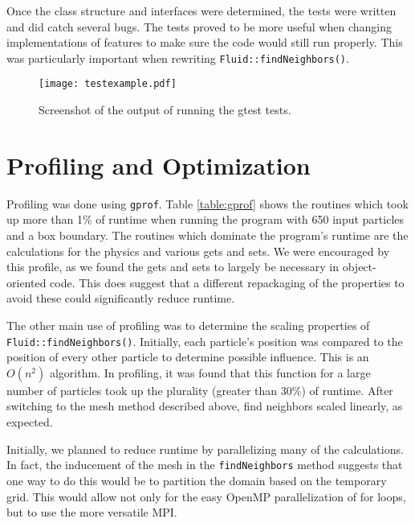 \documentclass[11pt]{article}
\begin{document}
Once the class structure and interfaces were determined, the tests were written
and did catch several bugs. The tests proved to be more useful when changing
implementations of features to make sure the code would still run properly. This
was particularly important when rewriting \texttt{Fluid::findNeighbors()}.

\begin{figure}
\begin{center}
\texttt{[image: testexample.pdf]}

\caption{Screenshot of the output of running the gtest tests.}
\label{fig:tests}
\end{center}
\end{figure}

\section{Profiling and Optimization}

Profiling was done using \texttt{gprof}. Table \ref{table:gprof} shows the
routines which took up more than 1\% of runtime when running the program
with 650 input particles and a box boundary. The routines which dominate
the program's runtime are the calculations for the physics and various gets
and sets. We were encouraged by this profile, as we found the gets and sets
to largely be necessary in object-oriented code. This does suggest that
a different repackaging of the properties to avoid these could significantly
reduce runtime.

The other main use of profiling was to determine the scaling properties of
\texttt{Fluid::findNeighbors()}. Initially, each particle's position was 
compared to the position of every other particle to determine possible
influence. This is an $O(n^2)$ algorithm. In profiling, it was found that
this function for a large number of particles took up the plurality (greater
than 30\%) of runtime. After switching to the mesh method described above,
find neighbors scaled linearly, as expected.

Initially, we planned to reduce runtime by parallelizing many of the 
calculations. In fact, the inducement of the mesh in the 
\texttt{findNeighbors} method suggests that one way to do this would be
to partition the domain based on the temporary grid. This would allow not
only for the easy OpenMP parallelization of for loops, but to use the more 
versatile MPI.
\end{document}
